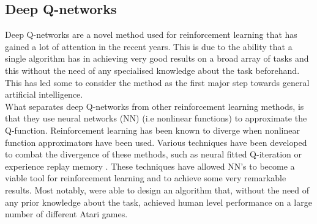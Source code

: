 \subsection{Deep Q-networks}
Deep Q-networks \cite{mnih2013playing} are a novel method used for reinforcement learning that has gained a lot of attention in the recent years. This is due to the ability that a single algorithm has in achieving very good results on a broad array of tasks and this without the need of any specialised knowledge about the task beforehand. This has led some to consider the method as the first major step towards general artificial intelligence.\\
What separates deep Q-networks from other reinforcement learning methods, is that they use neural networks (NN) (i.e nonlinear functions) to approximate the Q-function. Reinforcement learning has been known to diverge when nonlinear function approximators have been used. Various techniques have been developed to combat the divergence of these methods, such as neural fitted Q-iteration \cite{riedmiller2005neural} or experience replay memory \cite{Mnih2015}. These techniques have allowed NN's to become a viable tool for reinforcement learning and to achieve some very remarkable results. Most notably, \cite{Mnih2015} were able to design an algorithm that, without the need of any prior knowledge about the task, achieved human level performance on a large number of different Atari games.

































